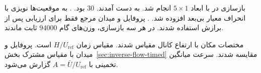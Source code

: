 بازسازی در  با ابعاد $5\times1$ انجام شد.
 به دست آمدند.
 $30$ بود.
.
به موقعیت‌ها نویزی با انحراف معیار بی‌بعد  افزوده شد.
.
پروفایل و میدان مرجع فقط برای ارزیابی پس از برازش استفاده شدند.
در هر سه بازسازی، وزن‌های گام $94000$ ثابت ماندند.

مختصات مکان با ارتفاع کانال مقیاس شدند.
مقیاس زمان $H/U_{\mathrm{ref}}$ است.
پروفایل و میدان با مقیاس مشترک بخش~\ref{sec:inverse-flow-timed} مقایسه شدند.
سرعت میانگین تخمینی با $A=\bar U/U_{\mathrm{ref}}$ گزارش می‌شود.

